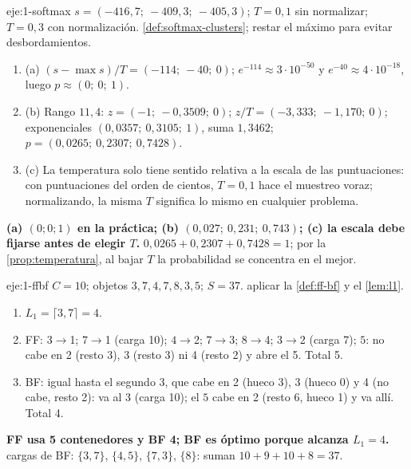 \begin{solucion}{eje:1-softmax}
\datos $s=(-416{,}7;\ -409{,}3;\ -405{,}3)$; $T=0{,}1$ sin normalizar; $T=0{,}3$ con normalización.
\planteamiento \cref{def:softmax-clusters}; restar el máximo para evitar desbordamientos.
\pasos
\begin{enumerate}[label=\arabic*.]
  \item (a) $(s-\max s)/T=(-114;\ -40;\ 0)$; $e^{-114}\approx 3\cdot10^{-50}$ y $e^{-40}\approx4\cdot10^{-18}$, luego $p\approx(0;\ 0;\ 1)$.
  \item (b) Rango $11{,}4$: $z=(-1;\ -0{,}3509;\ 0)$; $z/T=(-3{,}333;\ -1{,}170;\ 0)$; exponenciales $(0{,}0357;\ 0{,}3105;\ 1)$, suma $1{,}3462$; $p=(0{,}0265;\ 0{,}2307;\ 0{,}7428)$.
  \item (c) La temperatura solo tiene sentido relativa a la escala de las puntuaciones: con puntuaciones del orden de cientos, $T=0{,}1$ hace el muestreo voraz; normalizando, la misma $T$ significa lo mismo en cualquier problema.
\end{enumerate}
\resultado \textbf{(a) $(0;0;1)$ en la práctica; (b) $(0{,}027;\ 0{,}231;\ 0{,}743)$; (c) la escala debe fijarse antes de elegir $T$.}
\comprobacion $0{,}0265+0{,}2307+0{,}7428=1$; por la \cref{prop:temperatura}, al bajar $T$ la probabilidad se concentra en el mejor.
\end{solucion}

\begin{solucion}{eje:1-ffbf}
\datos $C=10$; objetos $3,7,4,7,8,3,5$; $S=37$.
\planteamiento aplicar la \cref{def:ff-bf} y el \cref{lem:l1}.
\pasos
\begin{enumerate}[label=\arabic*.]
  \item $L_1=\lceil 3{,}7\rceil=4$.
  \item FF: $3\to$1; $7\to$1 (carga 10); $4\to$2; $7\to$3; $8\to$4; $3\to$2 (carga 7); $5$: no cabe en 2 (resto 3), 3 (resto 3) ni 4 (resto 2) y abre el 5. Total 5.
  \item BF: igual hasta el segundo $3$, que cabe en 2 (hueco 3), 3 (hueco 0) y 4 (no cabe, resto 2): va al 3 (carga 10); el $5$ cabe en 2 (resto 6, hueco 1) y va allí. Total 4.
\end{enumerate}
\resultado \textbf{FF usa 5 contenedores y BF 4; BF es óptimo porque alcanza $L_1=4$.}
\comprobacion cargas de BF: $\{3,7\}$, $\{4,5\}$, $\{7,3\}$, $\{8\}$: suman $10+9+10+8=37$.
\end{solucion}


